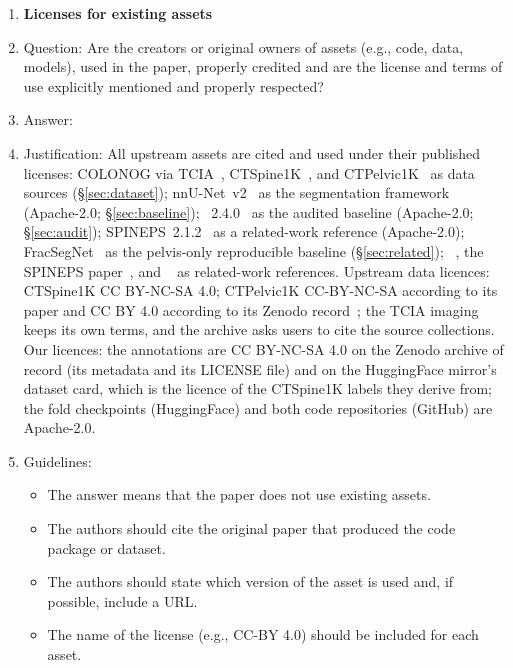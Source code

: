 \begin{enumerate}
\item {\bf Licenses for existing assets}
    \item[] Question: Are the creators or original owners of assets (e.g., code, data, models), used in the paper, properly credited and are the license and terms of use explicitly mentioned and properly respected?
    \item[] Answer: \answerYes{}
    \item[] Justification: All upstream assets are cited and used under their published licenses: COLONOG via TCIA~\citep{Smith2015DataCOLONOGRAPHY}, CTSpine1K~\citep{Deng2021CTSpine1K:Tomography}, and CTPelvic1K~\citep{Liu2021DeepModels} as data sources (\S\ref{sec:dataset}); nnU-Net~v2~\citep{Isensee2020NnU-Net:Segmentation,Isensee2024Nnu-netSegmentation} as the segmentation framework (Apache-2.0; \S\ref{sec:baseline}); \TS{}~2.4.0~\citep{Wasserthal2023TotalSegmentator:Images} as the audited baseline (Apache-2.0; \S\ref{sec:audit}); SPINEPS~2.1.2~\citep{MollerSPINEPSSoftware} as a related-work reference (Apache-2.0); FracSegNet~\citep{Liu2025AutomaticDataset} as the pelvis-only reproducible baseline (\S\ref{sec:related}); \VERIDAH{}~\citep{Moller2026VERIDAH:Sequences}, the SPINEPS paper~\citep{Moller2024SPINEPSautomaticSegmentation}, and \VerSe{}~\citep{Sekuboyina2021VerSe:Images} as related-work references. Upstream data licences: CTSpine1K CC BY-NC-SA 4.0; CTPelvic1K CC-BY-NC-SA according to its paper and CC BY 4.0 according to its Zenodo record~\citep{Liu2020CTPelvic1KData}; the TCIA imaging keeps its own terms, and the archive asks users to cite the source collections. Our licences: the \dataset{} annotations are CC BY-NC-SA 4.0 on the Zenodo archive of record (its metadata and its LICENSE file) and on the HuggingFace mirror's dataset card, which is the licence of the CTSpine1K labels they derive from; the fold checkpoints (HuggingFace) and both code repositories (GitHub) are Apache-2.0.
    \item[] Guidelines:
    \begin{itemize}
        \item The answer \answerNA{} means that the paper does not use existing assets.
        \item The authors should cite the original paper that produced the code package or dataset.
        \item The authors should state which version of the asset is used and, if possible, include a URL.
        \item The name of the license (e.g., CC-BY 4.0) should be included for each asset.

\end{itemize}
\end{enumerate}
